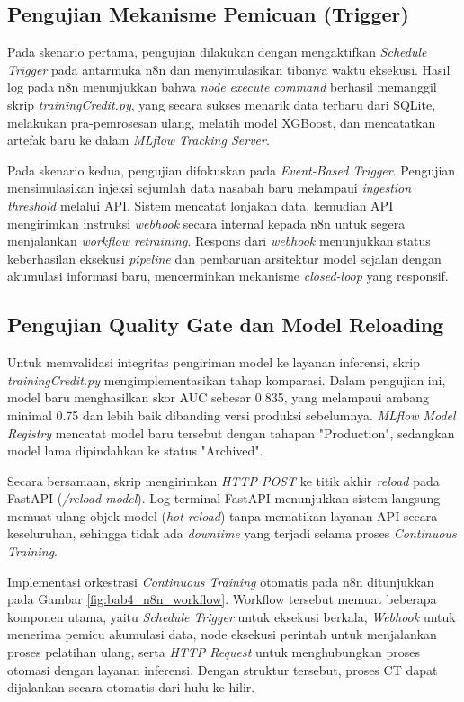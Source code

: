 \subsection{Pengujian Mekanisme Pemicuan (Trigger)}

Pada skenario pertama, pengujian dilakukan dengan mengaktifkan \textit{Schedule Trigger} pada antarmuka n8n dan menyimulasikan tibanya waktu eksekusi. Hasil log pada n8n menunjukkan bahwa \textit{node execute command} berhasil memanggil skrip \textit{trainingCredit.py}, yang secara sukses menarik data terbaru dari SQLite, melakukan pra-pemrosesan ulang, melatih model XGBoost, dan mencatatkan artefak baru ke dalam \textit{MLflow Tracking Server}. 

Pada skenario kedua, pengujian difokuskan pada \textit{Event-Based Trigger}. Pengujian mensimulasikan injeksi sejumlah data nasabah baru melampaui \textit{ingestion threshold} melalui API. Sistem mencatat lonjakan data, kemudian API mengirimkan instruksi \textit{webhook} secara internal kepada n8n untuk segera menjalankan \textit{workflow retraining}. Respons dari \textit{webhook} menunjukkan status keberhasilan eksekusi \textit{pipeline} dan pembaruan arsitektur model sejalan dengan akumulasi informasi baru, mencerminkan mekanisme \textit{closed-loop} yang responsif.

\subsection{Pengujian Quality Gate dan Model Reloading}

Untuk memvalidasi integritas pengiriman model ke layanan inferensi, skrip \textit{trainingCredit.py} mengimplementasikan tahap komparasi. Dalam pengujian ini, model baru menghasilkan skor AUC sebesar 0.835, yang melampaui ambang minimal 0.75 dan lebih baik dibanding versi produksi sebelumnya. \textit{MLflow Model Registry} mencatat model baru tersebut dengan tahapan "Production", sedangkan model lama dipindahkan ke status "Archived". 

Secara bersamaan, skrip mengirimkan \textit{HTTP POST} ke titik akhir \textit{reload} pada FastAPI (\textit{/reload-model}). Log terminal FastAPI menunjukkan sistem langsung memuat ulang objek model (\textit{hot-reload}) tanpa mematikan layanan API secara keseluruhan, sehingga tidak ada \textit{downtime} yang terjadi selama proses \textit{Continuous Training}.

Implementasi orkestrasi \textit{Continuous Training} otomatis pada n8n ditunjukkan pada Gambar \ref{fig:bab4_n8n_workflow}. Workflow tersebut memuat beberapa komponen utama, yaitu \textit{Schedule Trigger} untuk eksekusi berkala, \textit{Webhook} untuk menerima pemicu akumulasi data, node eksekusi perintah untuk menjalankan proses pelatihan ulang, serta \textit{HTTP Request} untuk menghubungkan proses otomasi dengan layanan inferensi. Dengan struktur tersebut, proses CT dapat dijalankan secara otomatis dari hulu ke hilir.

